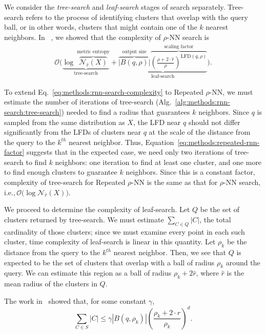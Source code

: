 We consider the \textit{tree-search} and \textit{leaf-search} stages of search separately.
Tree-search refers to the process of identifying clusters that overlap with the query ball, or in other words, clusters that might contain one of the $k$ nearest neighbors.
In ~\cite{ishaq2019clustered}, we showed that the complexity of $\rho$-NN search is
\begin{gather}
    \mathcal{O}
    \Bigg(
        \underbrace{
            \log~\overbrace{\mathcal{N}_{\hat{r}}(X)}^{\textrm{metric entropy}}
        }_{\textrm{tree-search}}
        +
        \underbrace{
            \overbrace{ \big| B(q, \rho) \big|}^{\textrm{output size}}
            \overbrace{ \left( \frac{\rho + 2 \cdot \hat{r}}{ \rho} \right) ^ {\text{LFD}(q, \rho)}}^{\textrm{scaling factor}}
        }_{\textrm{leaf-search}}
    \Bigg).
    \label{eq:methods:rnn-search-complexity}
\end{gather}

To extend Eq.~\ref{eq:methods:rnn-search-complexity} to Repeated $\rho$-NN, we must estimate the number of iterations of tree-search (Alg.~\ref{alg:methods:rnn-search:tree-search}) needed to find a radius that guarantees $k$ neighbors.
Since $q$ is sampled from the same distribution as $X$, the LFD near $q$ should not differ significantly from the LFDs of clusters near $q$ at the scale of the distance from the query to the $k^{th}$ nearest neighbor.
Thus, Equation~\ref{eq:methods:repeated-rnn-factor} suggests that in the expected case, we need only two iterations of tree-search to find $k$ neighbors:
one iteration to find at least one cluster, and one more to find enough clusters to guarantee $k$ neighbors.
Since this is a constant factor, complexity of tree-search for Repeated $\rho$-NN is the same as that for $\rho$-NN search, i.e.,\,$\mathcal{O}\big(\log\mathcal{N}_{\hat{r}}(X)\big)$.

We proceed to determine the complexity of leaf-search.
Let $Q$ be the set of clusters returned by tree-search.
We must estimate $\sum_{C \in Q} |C|$, the total cardinality of those clusters;
since we must examine every point in each such cluster, time complexity of leaf-search is linear in this quantity.
Let $\rho_k$ be the distance from the query to the $k^{th}$ nearest neighbor.
Then, we see that $Q$ is expected to be the set of clusters that overlap with a ball of radius $\rho_k$ around the query.
We can estimate this region as a ball of radius $\rho_k + 2\hat{r}$, where $\hat{r}$ is the mean radius of the clusters in $Q$.

The work in~\cite{yu2015entropy} showed that, for some constant $\gamma$,
\begin{equation*}
    \sum_{C \in S} |C| \leq \gamma \left| B(q, \rho_k) \right| \left(\frac{\rho_k + 2 \cdot \hat{r}}{\rho_k} \right)^d.
\end{equation*}

